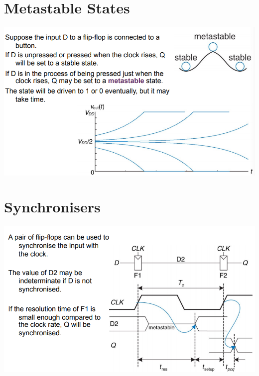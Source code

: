 \documentclass{article}[18pt]
\begin{document}
\section{Metastable States}
\begin{center}
	\includegraphics[scale=0.7]{figure22}
\end{center}
\section{Synchronisers}
\begin{center}
	\includegraphics[scale=0.7]{figure23}
\end{center}
\end{document}
